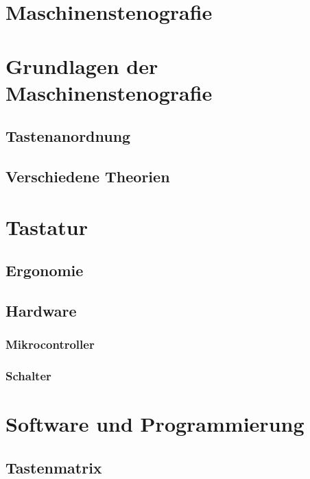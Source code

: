 \documentclass{article}
\begin{document}


\tableofcontents

\newpage

\section{Maschinenstenografie}

\section{Grundlagen der Maschinenstenografie}

\subsection{Tastenanordnung}

\subsection{Verschiedene Theorien}

\section{Tastatur}

\subsection{Ergonomie}

\subsection{Hardware}

\subsubsection{Mikrocontroller}

\subsubsection{Schalter}

\section{Software und Programmierung}

\subsection{Tastenmatrix}
\end{document}
